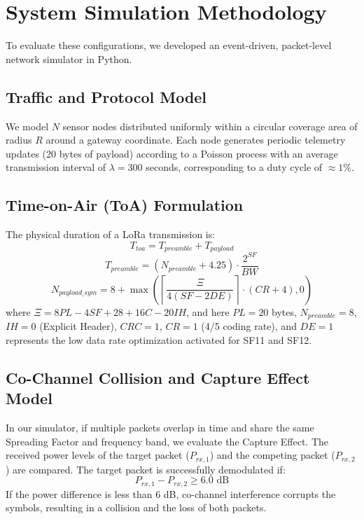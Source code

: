 \documentclass{ijuc}
\begin{document}
\section{System Simulation Methodology}
\label{sec:simulation}
To evaluate these configurations, we developed an event-driven, packet-level network simulator in Python.

\subsection{Traffic and Protocol Model}
We model $N$ sensor nodes distributed uniformly within a circular coverage area of radius $R$ around a gateway coordinate. Each node generates periodic telemetry updates (20 bytes of payload) according to a Poisson process with an average transmission interval of $\lambda = 300$ seconds, corresponding to a duty cycle of $\approx 1\%$. 

\subsection{Time-on-Air (ToA) Formulation}
The physical duration of a LoRa transmission is:
\begin{equation}
    T_{toa} = T_{preamble} + T_{payload}
\end{equation}
\begin{equation}
    T_{preamble} = (N_{preamble} + 4.25) \cdot \frac{2^{SF}}{BW}
\end{equation}
\begin{equation}
    N_{payload\_sym} = 8 + \max\left( \left\lceil \frac{\Xi}{4(SF - 2DE)} \right\rceil \cdot (CR + 4), 0 \right)
\end{equation}
where $\Xi = 8PL - 4SF + 28 + 16C - 20IH$, and here $PL = 20$ bytes, $N_{preamble} = 8$, $IH = 0$ (Explicit Header), $CRC = 1$, $CR = 1$ (4/5 coding rate), and $DE = 1$ represents the low data rate optimization activated for SF11 and SF12.

\subsection{Co-Channel Collision and Capture Effect Model}
In our simulator, if multiple packets overlap in time and share the same Spreading Factor and frequency band, we evaluate the Capture Effect. The received power levels of the target packet ($P_{rx,1}$) and the competing packet ($P_{rx,2}$) are compared. The target packet is successfully demodulated if:
\begin{equation}
    P_{rx,1} - P_{rx,2} \ge 6.0 \text{ dB}
\end{equation}
If the power difference is less than 6 dB, co-channel interference corrupts the symbols, resulting in a collision and the loss of both packets.
\end{document}
